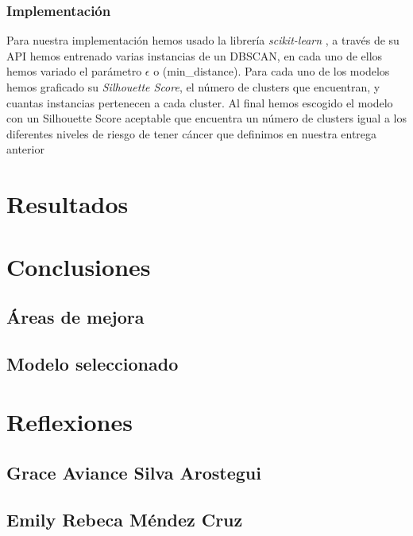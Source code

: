\documentclass[journal]{IEEEtran}
\begin{document}
            \subsubsection{Implementación}

                Para nuestra implementación hemos usado la librería \emph{scikit-learn} \cite{scikit-learn}, a través de su API hemos entrenado varias instancias de un DBSCAN, en cada uno de ellos hemos variado el parámetro $\epsilon$ o (min\_distance). Para cada uno de los modelos hemos graficado su \emph{Silhouette Score}, el número de clusters que encuentran, y cuantas instancias pertenecen a cada cluster. Al final hemos escogido el modelo con un Silhouette Score aceptable que encuentra un número de clusters igual a los diferentes niveles de riesgo de tener cáncer que definimos en nuestra entrega anterior

    \section{Resultados} \label{resultados}

    \section{Conclusiones} \label{conclusiones}
        
        \subsection{Áreas de mejora} \label{improvements}

        \subsection{Modelo seleccionado} \label{selected-model}

    \section{Reflexiones} \label{thoughts}
    
        \subsection{Grace Aviance Silva Arostegui}
        
        \subsection{Emily Rebeca Méndez Cruz}
        
\end{document}

